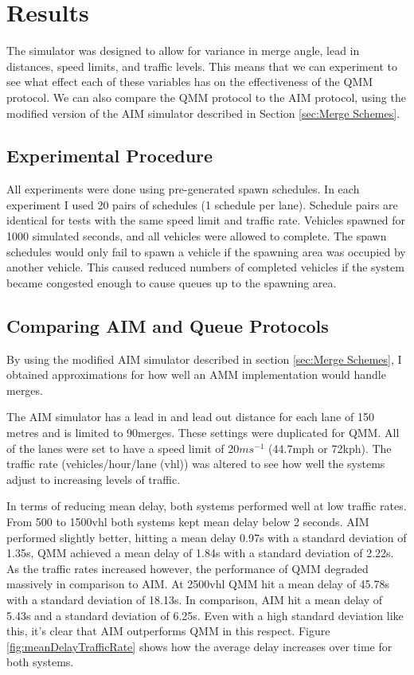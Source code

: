 \chapter{Results}
\label{cha:Results}
The simulator was designed to allow for variance in merge angle, lead in distances, speed limits, and traffic levels. This means that we can experiment to see what effect each of these variables has on the effectiveness of the QMM protocol. We can also compare the QMM protocol to the AIM protocol, using the modified version of the AIM simulator described in Section \ref{sec:Merge Schemes}.

\section{Experimental Procedure}
\label{sec:Experimental Procedure}
All experiments were done using pre-generated spawn schedules. In each experiment I used 20 pairs of schedules (1 schedule per lane). Schedule pairs are identical for tests with the same speed limit and traffic rate. Vehicles spawned for 1000 simulated seconds, and all vehicles were allowed to complete. The spawn schedules would only fail to spawn a vehicle if the spawning area was occupied by another vehicle. This caused reduced numbers of completed vehicles if the system became congested enough to cause queues up to the spawning area. 

\section{Comparing AIM and Queue Protocols}
\label{sec:Comparing AIM and Queue Protocols}
By using the modified AIM simulator described in section \ref{sec:Merge Schemes}, I obtained approximations for how well an AMM implementation would handle merges.

The AIM simulator has a lead in and lead out distance for each lane of 150 metres and is limited to 90\degree merges. These settings were duplicated for QMM. All of the lanes were set to have a speed limit of 20$\si{ms^{-1}}$ (44.7\si{mph} or 72\si{kph}). The traffic rate (vehicles/hour/lane (\si{vhl})) was altered to see how well the systems adjust to increasing levels of traffic.

In terms of reducing mean delay, both systems performed well at low traffic rates. From 500 to 1500\si{vhl} both systems kept mean delay below 2 seconds. AIM performed slightly better, hitting a mean delay 0.97\si{s} with a standard deviation of 1.35\si{s}, QMM achieved a mean delay of 1.84\si{s} with a standard deviation of 2.22\si{s}. As the traffic rates increased however, the performance of QMM degraded massively in comparison to AIM. At 2500\si{vhl} QMM hit a mean delay of 45.78\si{s} with a standard deviation of 18.13\si{s}. In comparison, AIM hit a mean delay of 5.43\si{s} and a standard deviation of 6.25\si{s}. Even with a high standard deviation like this, it's clear that AIM outperforms QMM in this respect. Figure \ref{fig:meanDelayTrafficRate} shows how the average delay increases over time for both systems.

